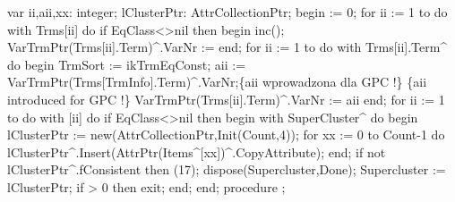 var
   ii,aii,xx: integer;
   lClusterPtr: AttrCollectionPtr;
begin
    := 0;
   for ii := 1 to  do
      with Trms[ii] do
         if  EqClass<>nil then
         begin
            inc();
            VarTrmPtr(Trms[ii].Term)^.VarNr := 
         end;
   for ii := 1 to  do
      with Trms[ii].Term^ do
   begin
      TrmSort := ikTrmEqConst;
      aii := VarTrmPtr(Trms[TrmInfo].Term)^.VarNr;\{aii wprowadzona dla GPC !\}
      \{aii introduced for GPC !\}
      VarTrmPtr(Trms[ii].Term)^.VarNr := aii
   end;
   for ii := 1 to  do
      with [ii] do
         if  EqClass<>nil then
         begin
            with SuperCluster^ do
            begin
               lClusterPtr := new(AttrCollectionPtr,Init(Count,4));
               for xx := 0 to Count-1 do
                  lClusterPtr^.Insert(AttrPtr(Items^[xx])^.CopyAttribute);
            end;
            if not lClusterPtr^.fConsistent then (17);
            dispose(Supercluster,Done);
            Supercluster := lClusterPtr;
            if  > 0 then exit;
         end;
end;
\eatline
{}\nwendcode{}\nwdocspar
\nwenddocs{}\endmoddef\nwstartdeflinemarkup\nwenddeflinemarkup
procedure ;
